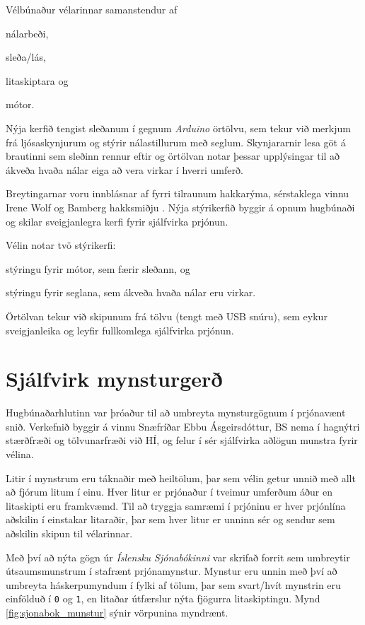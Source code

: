 \documentclass[a4paper,10pt,twocolumn]{article}
\begin{document}
Vélbúnaður vélarinnar samanstendur af \begin{enumerate*}[label=(\roman*)] 
\item nálarbeði, \item sleða/lás, \item litaskiptara og \item mótor. 
\end{enumerate*} Nýja kerfið tengist sleðanum í gegnum \textit{Arduino} örtölvu, sem tekur við merkjum frá ljósaskynjurum og stýrir nálastillurum með seglum. Skynjararnir lesa göt á brautinni sem sleðinn rennur eftir og örtölvan notar þessar upplýsingar til að ákveða hvaða nálar eiga að vera virkar í hverri umferð.

Breytingarnar voru innblásnar af fyrri tilraunum hakkarýma, sérstaklega vinnu Irene Wolf og Bamberg hakksmiðju \cite{wolf, bamberg}. Nýja stýrikerfið byggir á opnum hugbúnaði og skilar sveigjanlegra kerfi fyrir sjálfvirka prjónun. 

Vélin notar tvö stýrikerfi: \begin{enumerate*}[label=(\roman*)] 
\item stýringu fyrir mótor, sem færir sleðann, og \item stýringu fyrir seglana, sem ákveða hvaða nálar eru virkar. 
\end{enumerate*} Örtölvan tekur við skipunum frá tölvu (tengt með USB snúru), sem eykur sveigjanleika og leyfir fullkomlega sjálfvirka prjónun. 

\section{Sjálfvirk mynsturgerð}
Hugbúnaðarhlutinn var þróaður til að umbreyta mynsturgögnum í prjónavænt snið.
Verkefnið byggir á vinnu Snæfríðar Ebbu Ásgeirsdóttur, BS nema í hagnýtri stærðfræði
og tölvunarfræði við HÍ, og felur í sér sjálfvirka aðlögun munstra fyrir vélina.

Litir í mynstrum eru táknaðir með heiltölum, þar sem vélin getur unnið með allt að 
fjórum litum í einu. Hver litur er prjónaður í tveimur umferðum áður en litaskipti 
eru framkvæmd. Til að tryggja samræmi í prjóninu er hver prjónlína aðskilin í 
einstakar litaraðir, þar sem hver litur er unninn sér og sendur sem aðskilin 
skipun til vélarinnar.

Með því að nýta gögn úr \emph{Íslensku Sjónabókinni} \cite{sjonabok} var skrifað 
forrit sem umbreytir útsaumsmunstrum í stafrænt prjónamynstur. Mynstur eru unnin 
með því að umbreyta háskerpumyndum í fylki af tölum, þar sem svart/hvít mynstrin 
eru einfölduð í \texttt{0} og \texttt{1}, en litaðar útfærslur nýta fjögurra litaskiptingu. Mynd \ref{fig:sjonabok_munstur} sýnir vörpunina myndrænt.
\end{document}
